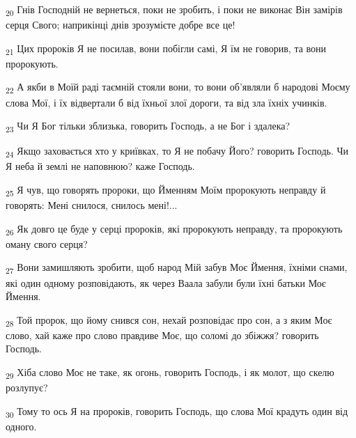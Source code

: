 \begin{tcolorbox}
\textsubscript{20} Гнів Господній не вернеться, поки не зробить, і поки не виконає Він замірів серця Свого; наприкінці днів зрозумієте добре все це!
\end{tcolorbox}
\begin{tcolorbox}
\textsubscript{21} Цих пророків Я не посилав, вони побігли самі, Я їм не говорив, та вони пророкують.
\end{tcolorbox}
\begin{tcolorbox}
\textsubscript{22} А якби в Моїй раді таємній стояли вони, то вони об'являли б народові Моєму слова Мої, і їх відвертали б від їхньої злої дороги, та від зла їхніх учинків.
\end{tcolorbox}
\begin{tcolorbox}
\textsubscript{23} Чи Я Бог тільки зблизька, говорить Господь, а не Бог і здалека?
\end{tcolorbox}
\begin{tcolorbox}
\textsubscript{24} Якщо заховається хто у криївках, то Я не побачу Його? говорить Господь. Чи Я неба й землі не наповнюю? каже Господь.
\end{tcolorbox}
\begin{tcolorbox}
\textsubscript{25} Я чув, що говорять пророки, що Йменням Моїм пророкують неправду й говорять: Мені снилося, снилось мені!...
\end{tcolorbox}
\begin{tcolorbox}
\textsubscript{26} Як довго це буде у серці пророків, які пророкують неправду, та пророкують оману свого серця?
\end{tcolorbox}
\begin{tcolorbox}
\textsubscript{27} Вони замишляють зробити, щоб народ Мій забув Моє Ймення, їхніми снами, які один одному розповідають, як через Ваала забули були їхні батьки Моє Ймення.
\end{tcolorbox}
\begin{tcolorbox}
\textsubscript{28} Той пророк, що йому снився сон, нехай розповідає про сон, а з яким Моє слово, хай каже про слово правдиве Моє, що соломі до збіжжя? говорить Господь.
\end{tcolorbox}
\begin{tcolorbox}
\textsubscript{29} Хіба слово Моє не таке, як огонь, говорить Господь, і як молот, що скелю розлупує?
\end{tcolorbox}
\begin{tcolorbox}
\textsubscript{30} Тому то ось Я на пророків, говорить Господь, що слова Мої крадуть один від одного.
\end{tcolorbox}
